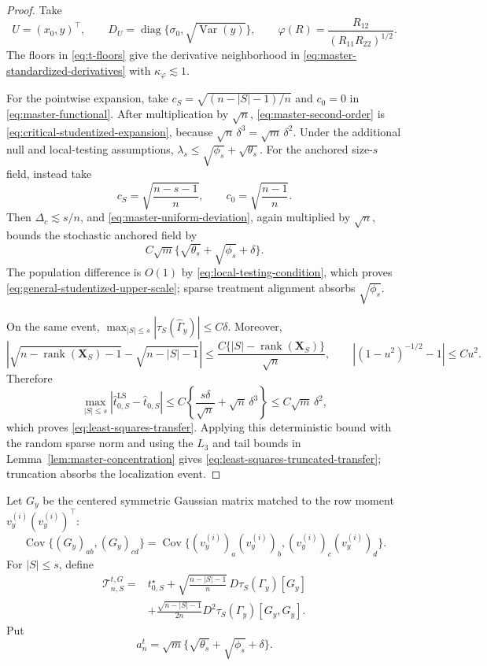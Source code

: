 \documentclass[a4paper,11pt,english]{article}
\newcommand{\Var}{\operatorname{Var}}
\newcommand{\Cov}{\operatorname{Cov}}
\begin{document}
\begin{proof}
Take
\[
 U=(x_0,y)^\top,\qquad
 D_U=\operatorname{diag}\{\sigma_0,\sqrt{\Var(y)}\},\qquad
 \varphi(R)=\frac{R_{12}}{(R_{11}R_{22})^{1/2}}.
\]
The floors in \eqref{eq:t-floors} give the derivative neighborhood in
\eqref{eq:master-standardized-derivatives} with
$\kappa_\varphi\lesssim1$.

For the pointwise expansion, take
$c_S=\sqrt{(n-|S|-1)/n}$ and $c_0=0$ in
\eqref{eq:master-functional}.  After multiplication by $\sqrt n$,
\eqref{eq:master-second-order} is
\eqref{eq:critical-studentized-expansion}, because
$\sqrt n\,\delta^3=\sqrt m\,\delta^2$.
Under the additional null and local-testing assumptions,
$\lambda_s\le\sqrt{\phi_s}+\sqrt{\theta_s}$.
For the anchored size-$s$ field, instead take
\[
 c_S=\sqrt{\frac{n-s-1}{n}},
 \qquad
 c_0=\sqrt{\frac{n-1}{n}}.
\]
Then $\Delta_c\lesssim s/n$, and
\eqref{eq:master-uniform-deviation}, again multiplied by $\sqrt n$,
bounds the stochastic anchored field by
\[
 C\sqrt m\{\sqrt{\theta_s}+\sqrt{\phi_s}+\delta\}.
\]
The population difference is $O(1)$ by
\eqref{eq:local-testing-condition}, which proves
\eqref{eq:general-studentized-upper-scale}; sparse treatment alignment
absorbs $\sqrt{\phi_s}$.

On the same event,
$\max_{|S|\le s}|\tau_S(\hat\Gamma_y)|\le C\delta$.  Moreover,
\begin{equation*}
 \left|\sqrt{n-\operatorname{rank}(\mathbf X_S)-1}
 -\sqrt{n-|S|-1}\right|
 \le\frac{C\{|S|-\operatorname{rank}(\mathbf X_S)\}}{\sqrt n},
 \qquad
 |(1-u^2)^{-1/2}-1|\le Cu^2.
\end{equation*}
Therefore
\begin{equation*}
 \max_{|S|\le s}|\hat t^{\mathrm{LS}}_{0,S}-\hat t_{0,S}|
 \le C\left\{\frac{s\delta}{\sqrt n}+\sqrt n\,\delta^3\right\}
 \le C\sqrt m\,\delta^2,
\end{equation*}
which proves \eqref{eq:least-squares-transfer}.  Applying this
deterministic bound with the random sparse norm and using the $L_3$ and
tail bounds in Lemma~\ref{lem:master-concentration} gives
\eqref{eq:least-squares-truncated-transfer}; truncation absorbs the
localization event.
\end{proof}

Let $G_y$ be the centered symmetric Gaussian matrix matched to the row
moment $v_y^{(i)}(v_y^{(i)})^\top$:
\begin{equation}\label{eq:studentized-matched-moment}
 \Cov\{(G_y)_{ab},(G_y)_{cd}\}
 =\Cov\{(v_y^{(i)})_a(v_y^{(i)})_b,
 (v_y^{(i)})_c(v_y^{(i)})_d\}.
\end{equation}
For $|S|\le s$, define
\begin{equation}\label{eq:studentized-matched-field}
\begin{split}
 \mathcal T^{t,G}_{n,S}
 ={}&t_{0,S}^\star
 +\sqrt{\frac{n-|S|-1}{n}}\,
 D\tau_S(\Gamma_y)[G_y]\\
 &+\frac{\sqrt{n-|S|-1}}{2n}
 D^2\tau_S(\Gamma_y)[G_y,G_y].
\end{split}
\end{equation}
Put
\begin{equation}\label{eq:studentized-matched-scale}
 a_n^t=\sqrt m\{\sqrt{\theta_s}+\sqrt{\phi_s}+\delta\}.
\end{equation}
\end{document}
